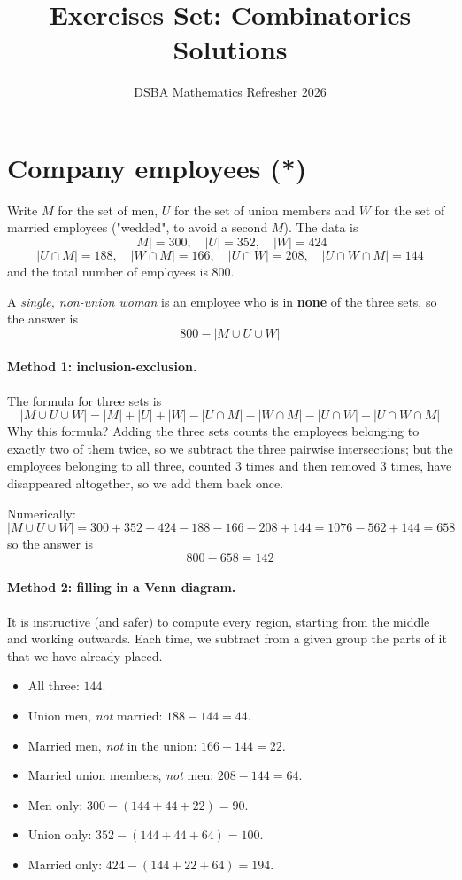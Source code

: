 \documentclass[]{article}
\title{Exercises Set: Combinatorics\\ \large Solutions}
\author{DSBA Mathematics Refresher 2026}
\date{}
\begin{document}
	\maketitle

	\section{Company employees (*)}

	Write $M$ for the set of men, $U$ for the set of union members and $W$ for the set of married employees ("wedded", to avoid a second $M$).
	The data is
	$$
	|M| = 300, \quad |U| = 352, \quad |W| = 424
	$$
	$$
	|U \cap M| = 188, \quad |W \cap M| = 166, \quad |U \cap W| = 208, \quad |U \cap W \cap M| = 144
	$$
	and the total number of employees is $800$.

	A \textit{single, non-union woman} is an employee who is in \textbf{none} of the three sets, so the answer is
	$$
	800 - |M \cup U \cup W|
	$$

	\paragraph{Method 1: inclusion-exclusion.}
	The formula for three sets is
	$$
	|M \cup U \cup W| = |M| + |U| + |W| - |U \cap M| - |W \cap M| - |U \cap W| + |U \cap W \cap M|
	$$
	Why this formula? Adding the three sets counts the employees belonging to exactly two of them twice, so we subtract the three pairwise intersections; but the employees belonging to all three, counted $3$ times and then removed $3$ times, have disappeared altogether, so we add them back once.

	Numerically:
	$$
	|M \cup U \cup W| = 300 + 352 + 424 - 188 - 166 - 208 + 144 = 1076 - 562 + 144 = 658
	$$
	so the answer is
	$$
	800 - 658 = \boxed{142}
	$$

	\paragraph{Method 2: filling in a Venn diagram.}
	It is instructive (and safer) to compute every region, starting from the middle and working outwards.
	Each time, we subtract from a given group the parts of it that we have already placed.
	\begin{itemize}
		\item All three: $144$.
		\item Union men, \textit{not} married: $188 - 144 = 44$.
		\item Married men, \textit{not} in the union: $166 - 144 = 22$.
		\item Married union members, \textit{not} men: $208 - 144 = 64$.
		\item Men only: $300 - (144 + 44 + 22) = 90$.
		\item Union only: $352 - (144 + 44 + 64) = 100$.
		\item Married only: $424 - (144 + 22 + 64) = 194$.
	\end{itemize}
\end{document}
